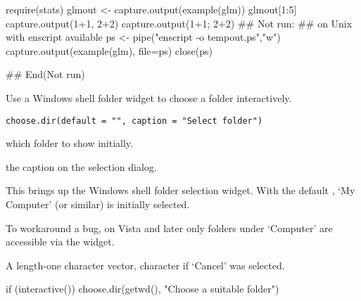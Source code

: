 %
\begin{Examples}
\begin{ExampleCode}
require(stats)
glmout <- capture.output(example(glm))
glmout[1:5]
capture.output(1+1, 2+2)
capture.output({1+1; 2+2})
## Not run: 
## on Unix with enscript available
ps <- pipe("enscript -o tempout.ps","w")
capture.output(example(glm), file=ps)
close(ps)

## End(Not run)
\end{ExampleCode}
\end{Examples}
%
\begin{Description}\relax
Use a Windows shell folder widget to choose a folder interactively.
\end{Description}
%
\begin{Usage}
\begin{verbatim}
choose.dir(default = "", caption = "Select folder")
\end{verbatim}
\end{Usage}
%
\begin{Arguments}
\begin{ldescription}
\item[\code{default}] which folder to show initially.
\item[\code{caption}] the caption on the selection dialog.
\end{ldescription}
\end{Arguments}
%
\begin{Details}\relax
This brings up   the Windows shell folder selection widget.  With the
default , `My Computer' (or similar) is
initially selected.

To workaround a bug, on Vista and later only folders under
`Computer' are accessible via the widget.
\end{Details}
%
\begin{Value}
A length-one character vector, character  if
`Cancel' was selected. 
\end{Value}
%
\begin{SeeAlso}\relax
{}
\end{SeeAlso}
%
\begin{Examples}
\begin{ExampleCode}
  if (interactive()) 
        choose.dir(getwd(), "Choose a suitable folder")
\end{ExampleCode}
\end{Examples}
